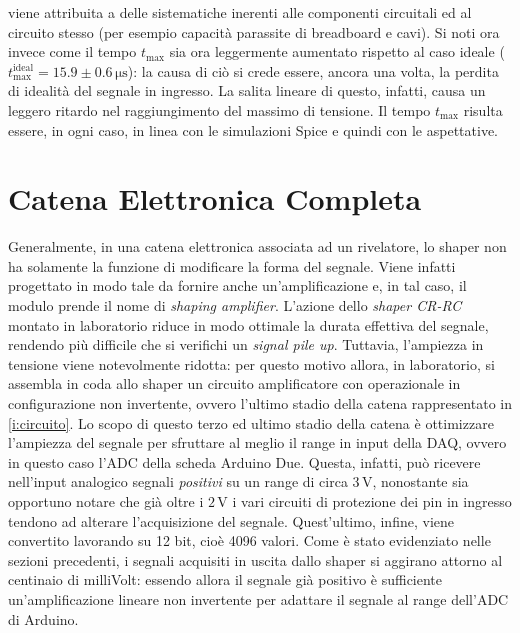\documentclass[a4paper,11pt]{article} %
\begin{document}
viene attribuita a delle sistematiche inerenti alle componenti circuitali ed al circuito stesso (per esempio capacità
parassite di breadboard e cavi). Si noti ora invece come il tempo $t_{\text{max}}$ sia ora leggermente aumentato
rispetto al caso ideale ($t_{\text{max}}^{\text{ideal}} = 15.9 \pm 0.6 \,\si{\us}$): la causa di ciò si crede essere,
ancora una volta, la perdita di idealità del segnale in ingresso. La salita lineare di questo, infatti, causa un leggero
ritardo nel raggiungimento del massimo di tensione. Il tempo $t_{\text{max}}$ risulta essere, in ogni caso, in linea con
le simulazioni Spice e quindi con le aspettative. 



\section{Catena Elettronica Completa}\label{s:catena}

Generalmente, in una catena elettronica associata ad un rivelatore, lo shaper non ha solamente la funzione di modificare
la forma del segnale. Viene infatti progettato in modo tale da fornire anche un'amplificazione e, in tal caso, il modulo
prende il nome di \textit{shaping amplifier}. L'azione dello \textit{shaper CR-RC} montato in laboratorio riduce in modo
ottimale la durata effettiva del segnale, rendendo più difficile che si verifichi un \textit{signal pile up}. Tuttavia,
l'ampiezza in tensione viene notevolmente ridotta: per questo motivo allora, in laboratorio, si assembla in coda allo
shaper un circuito amplificatore con operazionale in configurazione non invertente, ovvero l'ultimo stadio della catena
rappresentato in \autoref{i:circuito}. Lo scopo di questo terzo ed ultimo stadio della catena è ottimizzare l'ampiezza
del segnale per sfruttare al meglio il range in input della DAQ, ovvero in questo caso l'ADC della scheda Arduino Due.
Questa, infatti, può ricevere nell'input analogico segnali \textit{positivi} su un range di circa $3\,\si{\volt}$,
nonostante sia opportuno notare che già oltre i $2\,\si{\volt}$ i vari circuiti di protezione dei pin in ingresso
tendono ad alterare l'acquisizione del segnale. Quest'ultimo, infine, viene convertito lavorando su 12 bit, cioè 4096
valori. Come è stato evidenziato nelle sezioni precedenti, i segnali acquisiti in uscita dallo shaper si aggirano
attorno al centinaio di milliVolt: essendo allora il segnale già positivo è sufficiente un'amplificazione lineare non
invertente per adattare il segnale al range dell'ADC di Arduino. 
\end{document}
